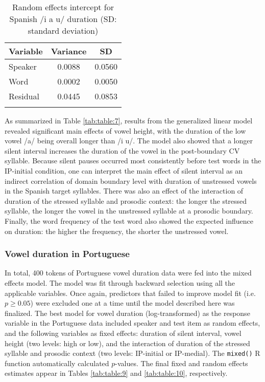 \documentclass[output=paper]{langscibook}
\begin{document}
\begin{table}
\caption{Random effects intercept for Spanish /i a u/ duration (SD: standard deviation)\label{tab:table:8}}
\begin{tabular}{lcc}
\lsptoprule
Variable &	Variance &	SD\\\midrule
Speaker	& 0.0088 &	0.0560\\
Word &	0.0002 &    0.0050\\
Residual &	0.0445 &	0.0853\\
\lspbottomrule
\end{tabular}
\end{table}




As summarized in Table \ref{tab:table:7}, results from the generalized linear model revealed 
significant main effects of vowel height, with the duration of the low vowel /a/ being 
overall longer than /i u/. The model also showed that a longer silent interval increases 
the duration of the vowel in the post-boundary CV syllable. Because silent pauses 
occurred most consistently before test words in the IP-initial condition, one can interpret 
the main effect of silent interval as an indirect correlation of domain boundary level with 
duration of unstressed vowels in the Spanish target syllables. There was also an effect of the interaction of duration of the stressed syllable and prosodic context: the longer the stressed syllable, the longer the vowel in the unstressed syllable at a prosodic boundary. Finally, the word frequency of the test word also showed the expected influence on duration: the higher the frequency, the shorter the unstressed vowel.

\subsubsection{Vowel duration in Portuguese}

In total, 400 tokens of Portuguese vowel duration data were fed into the mixed effects model. The model was fit through backward selection using all the applicable variables. Once again, predictors that failed to improve model fit (i.e. $p\geq0.05$) were excluded one at a time until the model described here was finalized. The best model for vowel duration (log-transformed) as the response variable in the Portuguese data included speaker and test item as random effects, and the following variables as fixed effects: duration of silent interval, vowel height (two levels: high or low), and the interaction of duration of the stressed syllable and prosodic context (two levels: IP-initial or IP-medial). The \texttt{mixed()} R function automatically calculated $p$-values. The final fixed and random effects estimates appear in Tables \ref{tab:table:9} and \ref{tab:table:10}, respectively.
\end{document}
